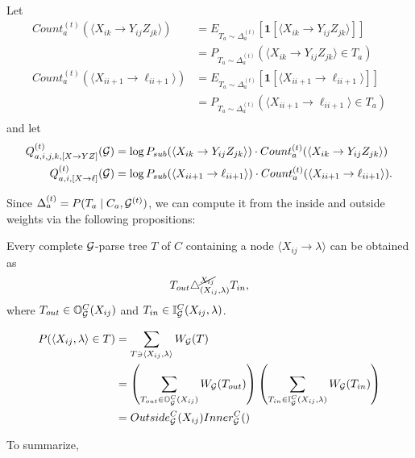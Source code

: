 \documentclass{article}
\def\ind{\mathbf{1}}
\newcommand\Inner{\mathbb{I}}
\newcommand\Outer{\mathbb{O}}
\newcommand\Full{\mathbb{F}}
\begin{document}
Let 
\begin{align*}
  Count_a^{(t)}(\langle X_{ik} \to Y_{ij} Z_{jk} \rangle) &=  E_{T_a \sim \Delta_a^{(t)}}[\ind [ 
\langle X_{ik}
\to Y_{ij} Z_{jk} \rangle]]\\
&= P_{T_a \sim \Delta_a^{(t)}}( \langle X_{ik} \to Y_{ij} Z_{jk}
\rangle \in T_a)\\
Count_a^{(t)}(\langle X_{ii+1} \to \ell_{i i+1} \rangle) &=
E_{T_a \sim \Delta_a^{(t)}}[\ind [ \langle X_{i i+1}
\to \ell_{i i+1} \rangle]] \\
&= P_{T_a \sim \Delta_a^{(t)}}( \langle X_{i i+1} \to \ell_{i i+1} \rangle \in T_a)\\
\end{align*}
and let
\begin{align*}
  Q^{(t)}_{a,i,j,k,[X\to YZ]}({\mathcal G}) &= 
\log P_{sub}(\langle X_{ik} \to Y_{ij}
Z_{jk}\rangle ) \cdot   Count_a^{(t)}(\langle X_{ik} \to Y_{ij} Z_{jk} \rangle)\\
Q^{(t)}_{a,i,[X\to \ell]}({\mathcal G}) &=
\log P_{sub}(\langle X_{i i+1} \to \ell_{i i+1}\rangle)
\cdot Count_a^{(t)}(\langle X_{ii+1} \to \ell_{i i+1} \rangle).
\end{align*}

Since $\Delta_a^{(t)} = P(T_a \mid C_a, {\mathcal G}^{(t)})$, we can compute
it from the inside and outside weights via the following propositions:
\mar{Define $\Full$.}

\begin{prop}
Every complete ${\mathcal G}$-parse tree $T$ of $C$ containing a node
$\langle X_{ij}\to \lambda\rangle$ can be obtained as
$$T_{out} \triangle^{\cancel{X_{ij}}}_{(X_{ij},\lambda)} T_{in},$$ 
where $T_{out}\in \Outer_\GGG^C(X_{ij})$ and $T_{in} \in
\Inner_\GGG^C(X_{ij}, \lambda)$.
\end{prop}

\begin{prop}
\begin{align*}
P(\langle X_{ij}, \lambda \rangle \in T) &=
\sum_{T \ni \langle X_{ij}, \lambda\rangle} W_\GGG(T)\\
&=
\left(\sum_{T_{out}\in \Outer_\GGG^C(X_{ij})}
  W_\GGG(T_{out}) \right)
\left(\sum_{T_{in}\in \Inner_\GGG^C(X_{ij},\lambda)} W_\GGG(T_{in})
\right)\\
&= Outside_\GGG^C(X_{ij}) Inner_\GGG^C()
\end{align*}
\end{prop}


To summarize,
\end{document}
